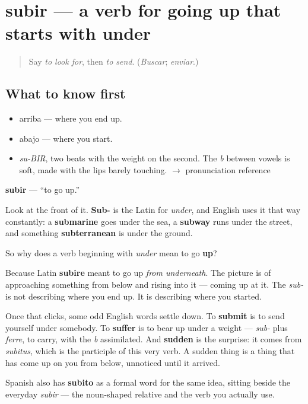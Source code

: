 \section[subir]{subir — a verb for going up that starts with under}

\label{lesson:ES-C384-subir}



\begin{quote}
Say \emph{to look for}, then \emph{to send}. (\emph{Buscar}; \emph{enviar}.)
\end{quote}

\subsection*{What to know first}
\begin{itemize}
\raggedright
  \item arriba — where you end up.
  \item abajo — where you start.
\end{itemize}

\begin{sounds}
\begin{itemize}
\raggedright
  \item \emph{su-BIR}, two beats with the weight on the second. The \emph{b} between vowels is soft, made with the lips barely touching. $\to$ pronunciation reference
\end{itemize}
\end{sounds}

\begin{cousinweb}
\textbf{subir} — \textquotedblleft{}to go up.\textquotedblright{}

Look at the front of it. \textbf{Sub-} is the Latin for \emph{under}, and English uses it that way constantly: a \textbf{submarine} goes under the sea, a \textbf{subway} runs under the street, and something \textbf{subterranean} is under the ground.

So why does a verb beginning with \emph{under} mean to go \textbf{up}?

Because Latin \textbf{subire} meant to go up \emph{from underneath}. The picture is of approaching something from below and rising into it — coming up at it. The \emph{sub-} is not describing where you end up. It is describing where you started.

Once that clicks, some odd English words settle down. To \textbf{submit} is to send yourself under somebody. To \textbf{suffer} is to bear up under a weight — \emph{sub-} plus \emph{ferre}, to carry, with the \emph{b} assimilated. And \textbf{sudden} is the surprise: it comes from \emph{subitus}, which is the participle of this very verb. A sudden thing is a thing that has come up on you from below, unnoticed until it arrived.

Spanish also has \textbf{subito} as a formal word for the same idea, sitting beside the everyday \emph{subir} — the noun-shaped relative and the verb you actually use.
\end{cousinweb}


